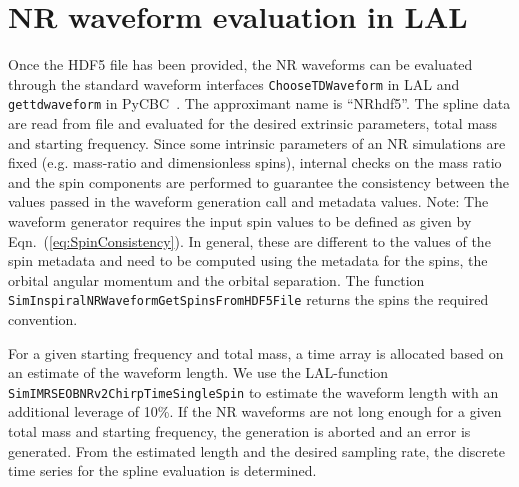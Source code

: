 \documentclass[11pt,tightenlines,article,amssymb,amsmath,amsfonts,superscriptaddress,nofootinbib]{revtex4}
\begin{document}








\section{NR waveform evaluation in LAL}
\label{sec:gen}
Once the HDF5 file has been provided, the NR waveforms can be evaluated through the standard waveform interfaces \texttt{ChooseTDWaveform} in LAL and \texttt{get\textunderscore td\textunderscore waveform} in PyCBC~\cite{Canton:2014ena}. The approximant name is ``NR\textunderscore hdf5''. 
The spline data are read from file and evaluated for the desired extrinsic parameters, total mass and starting frequency. Since some intrinsic parameters of an NR simulations are fixed (e.g. mass-ratio and dimensionless spins), internal checks on the mass ratio and the spin components are performed to guarantee the consistency between the values passed in the waveform generation call and metadata values. 
Note: The waveform generator requires the input spin values to be defined as given by Eqn.~(\ref{eq:SpinConsistency}). In general, these are different to the values of the spin metadata and need to be computed using the metadata for the spins, the orbital angular momentum and the orbital separation. The function \texttt{SimInspiralNRWaveformGetSpinsFromHDF5File} returns the spins the required convention. 

For a given starting frequency and total mass, a time array is allocated based on an estimate of the waveform length. We use the LAL-function 
\texttt{SimIMRSEOBNRv2ChirpTimeSingleSpin} to estimate the waveform length with an additional leverage of 10\%. If the NR waveforms are not long enough for a given total mass and starting frequency, the generation is aborted and an error is generated. From the estimated length and the desired sampling rate, the discrete time series for the spline evaluation is determined.
\end{document}

